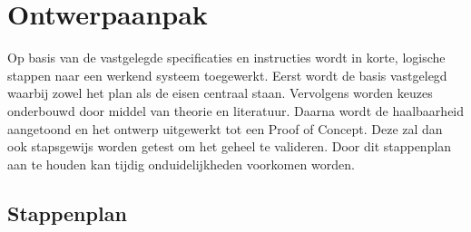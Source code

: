 
\section{Ontwerpaanpak}
Op basis van de vastgelegde specificaties en instructies wordt in korte, logische stappen naar een werkend systeem toegewerkt. Eerst wordt de basis vastgelegd waarbij zowel het plan als de eisen centraal staan. Vervolgens worden keuzes onderbouwd door middel van theorie en literatuur. Daarna wordt de haalbaarheid aangetoond en het ontwerp uitgewerkt tot een Proof of Concept. Deze zal dan ook stapsgewijs worden getest om het geheel te valideren. Door dit stappenplan aan te houden kan tijdig onduidelijkheden voorkomen worden.

\subsection{Stappenplan}

